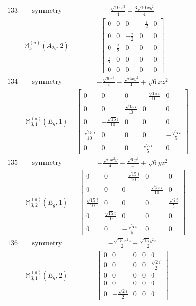 \documentclass[fleqn,8pt,landscape]{jsarticle}
\begin{document}
\begin{longtable}{ccc}
$ 133 $ & $ \text{symmetry} $ & $ \frac{\sqrt{10} x^{3}}{4} - \frac{3 \sqrt{10} x y^{2}}{4} $ \\
$  $ & $ \mathbb{M}_{3}^{(a)}(A_{2g},2) $ & $ \begin{bmatrix} 0 & 0 & 0 & - \frac{i}{2} & 0 \\ 0 & 0 & - \frac{i}{2} & 0 & 0 \\ 0 & \frac{i}{2} & 0 & 0 & 0 \\ \frac{i}{2} & 0 & 0 & 0 & 0 \\ 0 & 0 & 0 & 0 & 0 \end{bmatrix} $ \\ \hline
$ 134 $ & $ \text{symmetry} $ & $ - \frac{\sqrt{6} x^{3}}{4} - \frac{\sqrt{6} x y^{2}}{4} + \sqrt{6} x z^{2} $ \\
$  $ & $ \mathbb{M}_{3,1}^{(a)}(E_{g},1) $ & $ \begin{bmatrix} 0 & 0 & 0 & - \frac{\sqrt{15} i}{10} & 0 \\ 0 & 0 & \frac{\sqrt{15} i}{10} & 0 & 0 \\ 0 & - \frac{\sqrt{15} i}{10} & 0 & 0 & 0 \\ \frac{\sqrt{15} i}{10} & 0 & 0 & 0 & - \frac{\sqrt{5} i}{5} \\ 0 & 0 & 0 & \frac{\sqrt{5} i}{5} & 0 \end{bmatrix} $ \\ \hline
$ 135 $ & $ \text{symmetry} $ & $ - \frac{\sqrt{6} x^{2} y}{4} - \frac{\sqrt{6} y^{3}}{4} + \sqrt{6} y z^{2} $ \\
$  $ & $ \mathbb{M}_{3,2}^{(a)}(E_{g},1) $ & $ \begin{bmatrix} 0 & 0 & - \frac{\sqrt{15} i}{10} & 0 & 0 \\ 0 & 0 & 0 & - \frac{\sqrt{15} i}{10} & 0 \\ \frac{\sqrt{15} i}{10} & 0 & 0 & 0 & \frac{\sqrt{5} i}{5} \\ 0 & \frac{\sqrt{15} i}{10} & 0 & 0 & 0 \\ 0 & 0 & - \frac{\sqrt{5} i}{5} & 0 & 0 \end{bmatrix} $ \\ \hline
$ 136 $ & $ \text{symmetry} $ & $ - \frac{\sqrt{15} x^{2} z}{2} + \frac{\sqrt{15} y^{2} z}{2} $ \\
$  $ & $ \mathbb{M}_{3,1}^{(a)}(E_{g},2) $ & $ \begin{bmatrix} 0 & 0 & 0 & 0 & 0 \\ 0 & 0 & 0 & 0 & \frac{\sqrt{2} i}{2} \\ 0 & 0 & 0 & 0 & 0 \\ 0 & 0 & 0 & 0 & 0 \\ 0 & - \frac{\sqrt{2} i}{2} & 0 & 0 & 0 \end{bmatrix} $ \\ \hline

\end{longtable}
\end{document}
